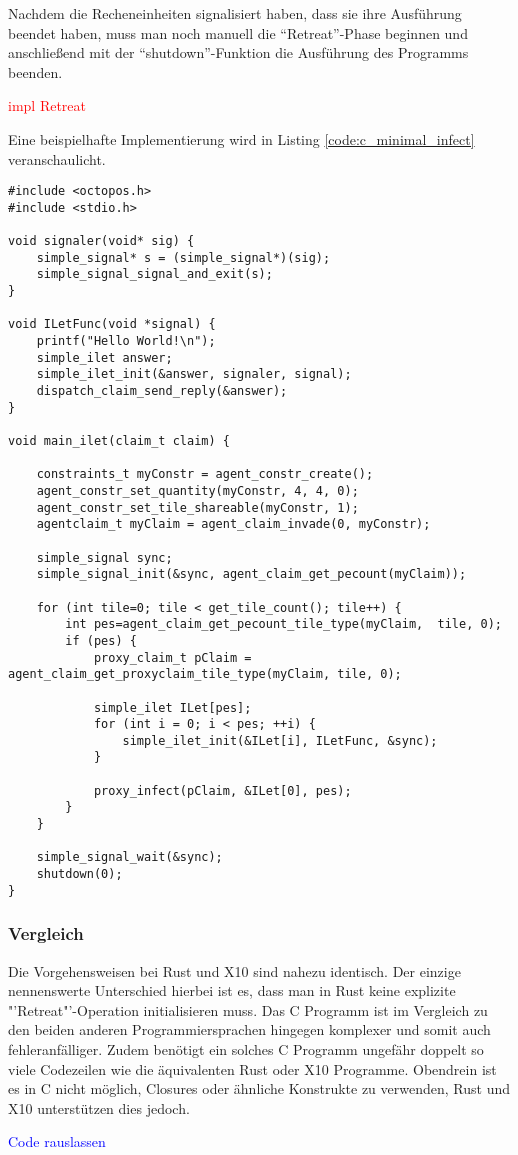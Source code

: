 Nachdem die Recheneinheiten signalisiert haben, dass sie ihre Ausführung beendet haben, muss man noch manuell
die "`Retreat"'-Phase beginnen und anschließend mit der "`shutdown"'-Funktion die Ausführung des Programms beenden.

\textcolor{red}{impl Retreat}

Eine beispielhafte Implementierung wird in Listing \ref{code:c_minimal_infect} veranschaulicht.

\begin{lstlisting}[float,caption={Minimales Invade, Infect, Retreat in C},label=code:c_minimal_infect]
#include <octopos.h>
#include <stdio.h>

void signaler(void* sig) {
    simple_signal* s = (simple_signal*)(sig);
    simple_signal_signal_and_exit(s);
}

void ILetFunc(void *signal) {
    printf("Hello World!\n");
    simple_ilet answer;
    simple_ilet_init(&answer, signaler, signal);
    dispatch_claim_send_reply(&answer);
}

void main_ilet(claim_t claim) {

    constraints_t myConstr = agent_constr_create();
    agent_constr_set_quantity(myConstr, 4, 4, 0);
    agent_constr_set_tile_shareable(myConstr, 1);
    agentclaim_t myClaim = agent_claim_invade(0, myConstr);

    simple_signal sync;
    simple_signal_init(&sync, agent_claim_get_pecount(myClaim));

    for (int tile=0; tile < get_tile_count(); tile++) {
        int pes=agent_claim_get_pecount_tile_type(myClaim,  tile, 0);
        if (pes) {
            proxy_claim_t pClaim = agent_claim_get_proxyclaim_tile_type(myClaim, tile, 0);

            simple_ilet ILet[pes];
            for (int i = 0; i < pes; ++i) {
                simple_ilet_init(&ILet[i], ILetFunc, &sync);
            }

            proxy_infect(pClaim, &ILet[0], pes);
        }
    }

    simple_signal_wait(&sync);
    shutdown(0);
}
\end{lstlisting}

\subsubsection{Vergleich}

Die Vorgehensweisen bei Rust und X10 sind nahezu identisch. Der einzige nennenswerte Unterschied hierbei ist es, dass
man in Rust keine explizite "'Retreat"'-Operation initialisieren muss.
Das C Programm ist im Vergleich zu den beiden anderen Programmiersprachen hingegen komplexer und somit auch
fehleranfälliger. Zudem benötigt ein solches C Programm ungefähr doppelt so viele 
Codezeilen wie die äquivalenten Rust oder X10 Programme. Obendrein ist es in C nicht möglich, Closures oder
ähnliche Konstrukte zu verwenden, Rust und X10 unterstützen dies jedoch.

\textcolor{blue}{Code rauslassen}

